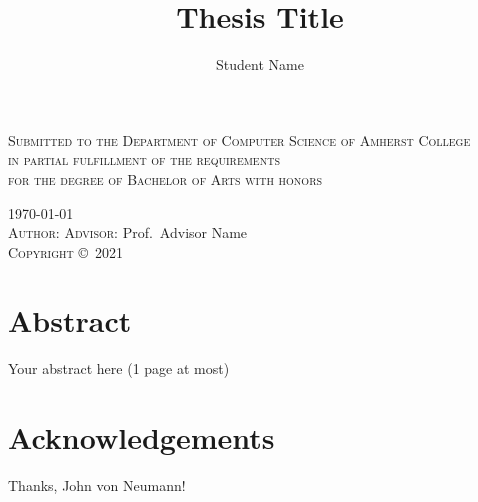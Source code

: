 \documentclass[11pt,twoside,openright]{report}
\author{Student Name}
\title{Thesis Title}
\newcommand{\classyear}{2021} %
\newcommand{\advisor}{Advisor Name} %
\begin{document}

\begin{titlepage}
  \centering
  {\LARGE\makeatletter\textbf{\MakeUppercase\@title}\makeatother}\par
  \vspace{0.6\baselineskip}
  {\scshape%
    Submitted to the %
    Department of Computer Science %
    of Amherst College \\[0.5\baselineskip]
    in partial fulfillment of the requirements \\[0.5\baselineskip]
    for the degree of %
    Bachelor of Arts with honors
  }\par
  \vspace{0.6\baselineskip}
  \textsc{\today}\\[1in] %
  \vspace{8\baselineskip}
  {\textsc{Author:} \makeatletter\@author\makeatother%
  \hfill\textsc{Advisor:} Prof.\ \advisor}\\[0.6\baselineskip]
  \vfill
  \textsc{Copyright} \copyright\ \textsc{\classyear}\ %
  {\scshape \makeatletter\@author\makeatother}
\end{titlepage}


\chapter*{Abstract} %

Your abstract here (1 page at most)

\chapter*{Acknowledgements} %

Thanks, John von Neumann!

\tableofcontents %
\end{document}
